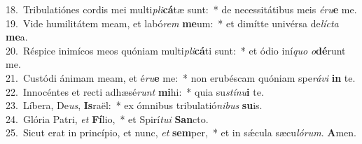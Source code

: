 {18.~}Tribulatiónes cordis mei multi\textit{pli}\textbf{cá}tæ sunt:~* de necessitátibus meis \textit{é}\textit{ru}\textbf{e} me.\\
{19.~}Vide humilitátem meam, et labó\textit{rem} \textbf{me}um:~* et dimítte univérsa de\textit{lí}\textit{cta} \textbf{me}a.\\
{20.~}Réspice inimícos meos quóniam multi\textit{pli}\textbf{cá}ti sunt:~* et ódio iní\textit{quo} \textit{o}\textbf{dé}runt me.\\
{21.~}Custódi ánimam meam, et é\textit{ru}\textbf{e} me:~* non erubéscam quóniam spe\textit{rá}\textit{vi} \textbf{in} te.\\
{22.~}Innocéntes et recti adhæsé\textit{runt} \textbf{mi}hi:~* quia su\textit{stí}\textit{nu}\textbf{i} te.\\
{23.~}Líbera, De\textit{us}, \textbf{Is}raël:~* ex ómnibus tribulatió\textit{ni}\textit{bus} \textbf{su}is.\\
{24.~}Glória Patri, \textit{et} \textbf{Fí}lio,~* et Spirí\textit{tu}\textit{i} \textbf{San}cto.\\
{25.~}Sicut erat in princípio, et nunc, \textit{et} \textbf{sem}per,~* et in sǽcula sæcu\textit{ló}\textit{rum}. \textbf{A}men.\\
